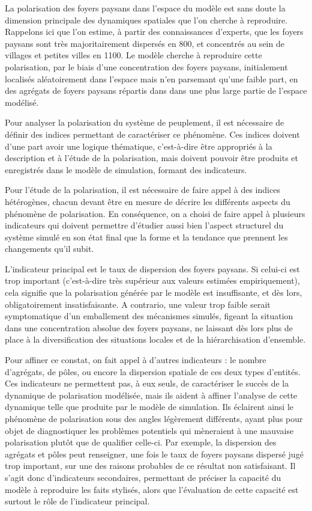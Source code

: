 La polarisation des foyers paysans dans l'espace du modèle est sans doute la dimension principale des dynamiques spatiales que l'on cherche à reproduire.
Rappelons ici que l'on estime, à partir des connaissances d'experts, que les foyers paysans sont très majoritairement dispersés en 800, et concentrés au sein de villages et petites villes en 1100.
Le modèle cherche à reproduire cette polarisation, par le biais d'une concentration des foyers paysans, initialement localisés aléatoirement dans l'espace mais n'en parsemant qu'une faible part, en des agrégats de foyers paysans répartis dans dans une plus large partie de l'espace modélisé.

Pour analyser la polarisation du système de peuplement, il est nécessaire de définir des indices permettant de caractériser ce phénomène.
Ces indices doivent d'une part avoir une logique thématique, c'est-à-dire être appropriés à la description et à l'étude de la polarisation, mais doivent pouvoir être produits et enregistrés dans le modèle de simulation, formant des indicateurs.

Pour l'étude de la polarisation, il est nécessaire de faire appel à des indices hétérogènes, chacun devant être en mesure de décrire les différents aspects du phénomène de polarisation.
En conséquence, on a choisi de faire appel à plusieurs indicateurs qui doivent permettre d'étudier aussi bien l'aspect structurel du système simulé en son état final que la forme et la tendance que prennent les changements qu'il subit.

L'indicateur principal est le taux de dispersion des foyers paysans.
Si celui-ci est trop important (c'est-à-dire très supérieur aux valeurs estimées empiriquement), cela signifie que la polarisation générée par le modèle est insuffisante, et dès lors, obligatoirement insatisfaisante.
A contrario, une valeur trop faible serait symptomatique d'un emballement des mécanismes simulés, figeant la situation dans une concentration absolue des foyers paysans, ne laissant dès lors plus de place à la diversification des situations locales et de la hiérarchisation d'ensemble.

Pour affiner ce constat, on fait appel à d'autres indicateurs :
le nombre d'agrégats, de pôles, ou encore la dispersion spatiale de ces deux types d'entités.
Ces indicateurs ne permettent pas, à eux seuls, de caractériser le succès de la dynamique de polarisation modélisée, mais ils aident à affiner l'analyse de cette dynamique telle que produite par le modèle de simulation.
Ils éclairent ainsi le phénomène de polarisation sous des angles légèrement différents, ayant plus pour objet de diagnostiquer les problèmes potentiels qui mèneraient à une mauvaise polarisation plutôt que de qualifier celle-ci.
Par exemple, la dispersion des agrégats et pôles peut renseigner, une fois le taux de foyers paysans dispersé jugé trop important, sur une des raisons probables de ce résultat non satisfaisant.
Il s'agit donc d'indicateurs secondaires, permettant de préciser la capacité du modèle à reproduire les faits stylisés, alors que l'évaluation de cette capacité est surtout le rôle de l'indicateur principal.


